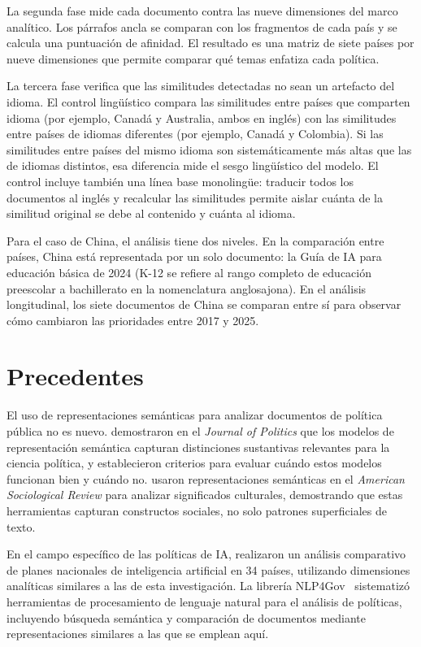 La segunda fase mide cada documento contra las nueve dimensiones del marco analítico. Los párrafos ancla se comparan con los fragmentos de cada país y se calcula una puntuación de afinidad. El resultado es una matriz de siete países por nueve dimensiones que permite comparar qué temas enfatiza cada política.

La tercera fase verifica que las similitudes detectadas no sean un artefacto del idioma. El control lingüístico compara las similitudes entre países que comparten idioma (por ejemplo, Canadá y Australia, ambos en inglés) con las similitudes entre países de idiomas diferentes (por ejemplo, Canadá y Colombia). Si las similitudes entre países del mismo idioma son sistemáticamente más altas que las de idiomas distintos, esa diferencia mide el sesgo lingüístico del modelo. El control incluye también una línea base monolingüe: traducir todos los documentos al inglés y recalcular las similitudes permite aislar cuánta de la similitud original se debe al contenido y cuánta al idioma.

Para el caso de China, el análisis tiene dos niveles. En la comparación entre países, China está representada por un solo documento: la Guía de IA para educación básica de 2024 (K-12 se refiere al rango completo de educación preescolar a bachillerato en la nomenclatura anglosajona). En el análisis longitudinal, los siete documentos de China se comparan entre sí para observar cómo cambiaron las prioridades entre 2017 y 2025.


\section{Precedentes}

El uso de representaciones semánticas para analizar documentos de política pública no es nuevo. \citet{rodriguez2022embeddings} demostraron en el \textit{Journal of Politics} que los modelos de representación semántica capturan distinciones sustantivas relevantes para la ciencia política, y establecieron criterios para evaluar cuándo estos modelos funcionan bien y cuándo no. \citet{kozlowski2019geometry} usaron representaciones semánticas en el \textit{American Sociological Review} para analizar significados culturales, demostrando que estas herramientas capturan constructos sociales, no solo patrones superficiales de texto.

En el campo específico de las políticas de IA, \citet{fatima2020aipolicy} realizaron un análisis comparativo de planes nacionales de inteligencia artificial en 34 países, utilizando dimensiones analíticas similares a las de esta investigación. La librería NLP4Gov~\citep{nlp4gov2024} sistematizó herramientas de procesamiento de lenguaje natural para el análisis de políticas, incluyendo búsqueda semántica y comparación de documentos mediante representaciones similares a las que se emplean aquí.

